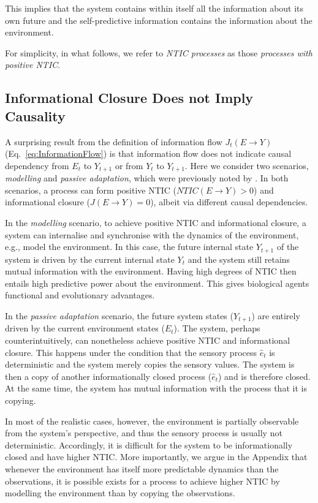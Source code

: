 \documentclass[utf8]{article}
\begin{document}
			\noindent
			This implies that the system contains within itself all the information about its own future and the self-predictive information contains the information about the environment.
			
			For simplicity, in what follows, we refer to \textit{NTIC processes} as those \textit{processes with positive NTIC}.
			
			\subsection{Informational Closure Does not Imply Causality}\label{sec:causality}
                A surprising result from the definition of information flow $J_t(E\rightarrow Y)$ (Eq.~\ref{eq:InformationFlow}) is that information flow does not indicate causal dependency from $E_t$ to $Y_{t+1}$ or from $Y_t$ to $Y_{t+1}$. Here we consider two scenarios, \textit{modelling} and \textit{passive adaptation}, which were previously noted by \citet{BERTSCHINGER.2006}. In both scenarios, a process can form positive NTIC ($NTIC(E\rightarrow Y)> 0$) and informational closure ($J(E\rightarrow Y)=0$), albeit via different causal dependencies.
                
                In the \textit{modelling} scenario, to achieve positive NTIC and informational closure, a system can internalise and synchronise with the dynamics of the environment, e.g., model the environment. In this case, the future internal state $Y_{t+1}$ of the system is driven by the current internal state $Y_t$ and the system still retains mutual information with the environment. Having high degrees of NTIC then entails high predictive power about the environment. This gives biological agents functional and evolutionary advantages.
                
                In the \textit{passive adaptation} scenario, the future system states ($Y_{t+1}$) are entirely driven by the current environment states ($E_t$). The system, perhaps counterintuitively, can nonetheless achieve positive NTIC and informational closure. This happens under the condition that the sensory process $\hat{e}_t$ is deterministic and the system merely copies the sensory values. The system is then a copy of another informationally closed process ($\hat{e}_t$) and is therefore closed. At the same time, the system has mutual information with the process that it is copying. 
                
                In most of the realistic cases, however, the environment is partially observable from the system's perspective, and thus the sensory process is usually not deterministic. Accordingly, it is difficult for the system to be informationally closed and have higher NTIC.
                More importantly, we argue in the Appendix that whenever the environment has itself more predictable dynamics than the observations, it is possible exists for a process to achieve higher NTIC by modelling the environment than by copying the observations. 
                
\end{document}
